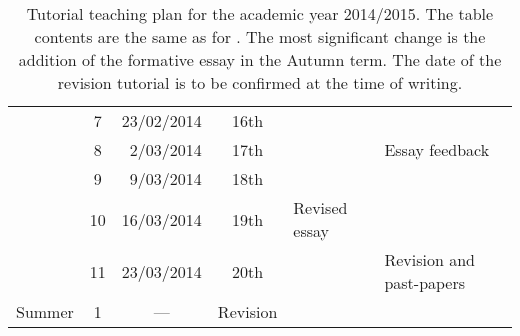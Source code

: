 \begin{table}
\begin{tabular}{c c r c l l}
			 & \hphantom{0}7 &	23/02/2014 & 16th		&			& \\
			 & \hphantom{0}8 &	 2/03/2014 & 17th		&			& Essay feedback \\
			 & \hphantom{0}9 &	 9/03/2014 & 18th		&			& \\
			 & 10		 &	16/03/2014 & 19th		& Revised essay		& \\
			 & 11		 &	23/03/2014 & 20th		&			& Revision and past-papers \\
\midrule
\multirow{1}{*}{Summer}	 & \hphantom{0}1 & \multicolumn{1}{c}{---} & Revision		&			& \\
 \bottomrule
\end{tabular}
\caption{Tutorial teaching plan for the academic year 2014/2015. The table contents are the same as for . The most significant change is the addition of the formative essay in the Autumn term. The date of the revision tutorial is to be confirmed at the time of writing.}\label{tab:2014-15}
\end{table}
